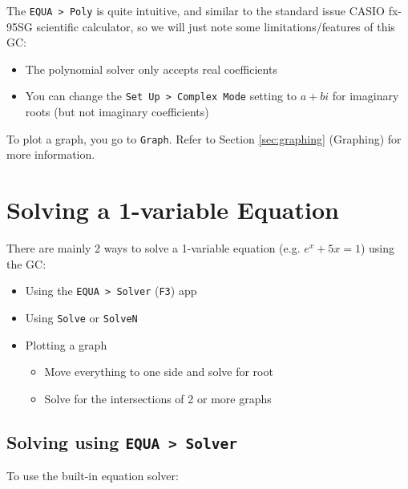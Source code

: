 \documentclass[a5paper]{memoir}
\def\code#1{\texttt{#1}}
\def\Fone{(\code{F1}) }
\def\Fthree{(\code{F3}) }
\def\Fsix{(\code{F6}) }
\begin{document}
The \code{EQUA > Poly} is quite intuitive, and similar to the standard issue CASIO fx-95SG scientific calculator, so we will just note some limitations/features of this GC:
\begin{itemize}
	\item The polynomial solver only accepts real coefficients
	\item You can change the \code{Set Up > Complex Mode} setting to \code{$a+bi$} for imaginary roots (but not imaginary coefficients)
\end{itemize}

To plot a graph, you go to \code{Graph}. Refer to Section \ref{sec:graphing} (Graphing) for more information.

\section{Solving a 1-variable Equation}
There are mainly 2 ways to solve a 1-variable equation (e.g. $e^x + 5x = 1$) using the GC:
\begin{itemize}
	\item Using the \code{EQUA > Solver} \Fthree app
	\item Using \code{Solve} or \code{SolveN}
	\item Plotting a graph
	\begin{itemize}
		\item Move everything to one side and solve for root
		\item Solve for the intersections of 2 or more graphs
	\end{itemize}
\end{itemize}

\subsection{Solving using \code{EQUA > Solver}}
To use the built-in equation solver:
\end{document}
